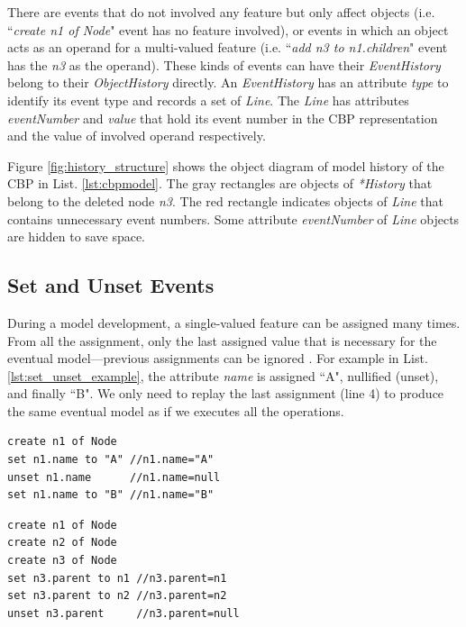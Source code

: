 \documentclass{llncs}
\begin{document}
There are events that do not involved any feature but only affect objects (i.e. ``\emph{create n1 of Node}" event has no feature involved), or events in which an object acts as an operand for a multi-valued feature (i.e. ``\emph{add n3 to n1.children}" event has the \emph{n3} as the operand). These kinds of events can have their \emph{EventHistory} belong to their \emph{ObjectHistory} directly. An \emph{EventHistory} has an attribute \emph{type} to identify its event type and records a set of \emph{Line}. The \emph{Line} has attributes \emph{eventNumber} and \emph{value} that hold its event number in the CBP representation and the value of involved operand respectively. 

Figure \ref{fig:history_structure} shows the object diagram of model history of the CBP in List. \ref{lst:cbpmodel}. The gray rectangles are objects of \emph{*History} that belong to the deleted node \emph{n3}. The red rectangle indicates objects of \emph{Line} that contains unnecessary event numbers. Some attribute \emph{eventNumber} of \emph{Line} objects are hidden to save space.     

\subsection{Set and Unset Events}
\label{subsec:set_and_unset_events}
During a model development, a single-valued feature can be assigned many times. From all the assignment, only the last assigned value that is necessary for the eventual model---previous assignments can be ignored . For example in List. \ref{lst:set_unset_example}, the attribute \emph{name} is assigned ``A", nullified (unset), and finally ``B". We only need to replay the last assignment (line 4) to produce the same eventual model as if we executes all the operations. 

\noindent
\begin{minipage}[t]{0.49\linewidth}
\begin{lstlisting}[style=eol,caption={The CBP representation of attribute \emph{name} assignments.},label=lst:set_unset_example]
create n1 of Node
set n1.name to "A" //n1.name="A"    
unset n1.name      //n1.name=null
set n1.name to "B" //n1.name="B"
\end{lstlisting}
\end{minipage}
\hfill
\begin{minipage}[t]{0.49\linewidth}
\begin{lstlisting}[style=eol,caption={The CBP representation of reference  \emph{parent} assignments.},label=lst:set_unset_reference]
create n1 of Node
create n2 of Node
create n3 of Node
set n3.parent to n1 //n3.parent=n1
set n3.parent to n2 //n3.parent=n2
unset n3.parent     //n3.parent=null
\end{lstlisting}
\end{minipage}
\end{document}
